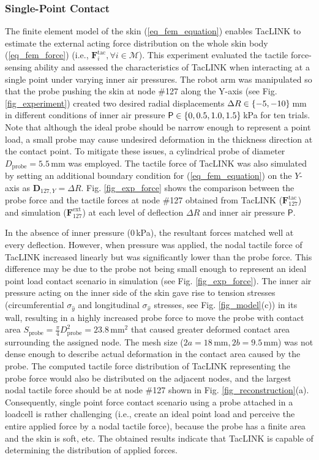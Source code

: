 \documentclass[10pt,letterpaper,journal,final,twoside,twocolumn,nofonttune]{IEEEtran}
\begin{document}
\subsubsection{Single-Point Contact}
The finite element model of the skin (\ref{eq_fem_equation}) enables TacLINK to estimate the external acting force distribution on the whole skin body (\ref{eq_fem_force}) (i.e., $\mathbf{F}^{\text{tac}}_{i}, \forall i\in \mathcal{M}$).
This experiment  evaluated the tactile force-sensing ability and assessed the characteristics of TacLINK when interacting at a single point under varying inner air pressures. The robot arm was manipulated so that the probe pushing the skin at node \#127 along the Y-axis (see Fig. \ref{fig_experiment}) created two desired radial displacements $\Delta{R} \in \set{-5, -10}$\,mm in different conditions of inner air pressure $\mathsf{P} \in \set{0, 0.5, 1.0,1.5}$\,kPa for ten trials. Note that although the ideal probe should be narrow enough to represent a point load, a small probe may cause undesired deformation in the thickness direction at the contact point. To mitigate these issues, a cylindrical probe of diameter $D_{\text{probe}}=5.5$\,mm was employed. The tactile force of TacLINK was also simulated by setting an additional boundary condition for (\ref{eq_fem_equation}) on the $Y$-axis as $\mathbf{D}_{127,Y} = \Delta{R}$. Fig. \ref{fig_exp_force} shows the comparison between the probe force and the tactile forces at node \#127 obtained from TacLINK ($\mathbf{F}^{\text{tac}}_{127}$) and simulation ($\mathbf{F}^{\text{ext}}_{127}$) at each level of deflection $\Delta{R}$ and inner air pressure $\mathsf{P}$.

In the absence of inner pressure ($0$\,kPa), the resultant forces matched well at every deflection. However, when pressure was applied, the nodal tactile force of TacLINK increased linearly but was significantly lower than the probe force. This difference may be due to the probe not being small enough to represent an ideal point load contact scenario in simulation (see Fig. \ref{fig_exp_force}). The inner air pressure acting on the inner side of the skin gave rise to tension stresses (circumferential $\sigma_{\hat{y}}$ and longitudinal $\sigma_{\hat{x}}$ stresses, see Fig. \ref{fig_model}(c)) in its wall, resulting in a highly increased probe force to move the probe with contact area $S_{\text{probe}}=\frac{\pi}{4}{D^2_\text{probe}}= 23.8\,\text{mm}^2$ that caused greater deformed contact area surrounding the assigned node. The mesh size ($2a=18\,\text{mm}, 2b=9.5\,\text{mm}$) was not dense enough to describe actual deformation in the contact area caused by the probe. The computed tactile force distribution of TacLINK representing the probe force would also be distributed on the adjacent nodes, and the largest nodal tactile force should be at node \#127 shown in Fig. \ref{fig_reconstruction}(a). Consequently, single point force contact scenario using a probe attached in a loadcell is rather challenging (i.e., create an ideal point load and perceive the entire applied force by a nodal tactile force), because the probe has a finite area and the skin is soft, etc. The obtained results indicate that TacLINK is capable of determining the distribution of applied forces.
\end{document}
